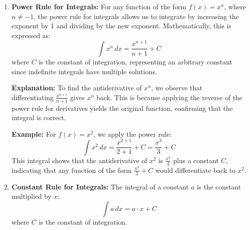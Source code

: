 \begin{enumerate}
    \item \textbf{Power Rule for Integrals:} For any function of the form \( f(x) = x^n \), where \( n \neq -1 \), the power rule for integrals allows us to integrate by increasing the exponent by 1 and dividing by the new exponent. Mathematically, this is expressed as:
    \[
    \int x^n \, dx = \frac{x^{n+1}}{n+1} + C
    \]
    where \( C \) is the constant of integration, representing an arbitrary constant since indefinite integrals have multiple solutions.

    \textbf{Explanation:} To find the antiderivative of \( x^n \), we observe that differentiating \( \frac{x^{n+1}}{n+1} \) gives \( x^n \) back. This is because applying the reverse of the power rule for derivatives yields the original function, confirming that the integral is correct.

    \textbf{Example:} For \( f(x) = x^2 \), we apply the power rule:
    \[
    \int x^2 \, dx = \frac{x^{2+1}}{2+1} + C = \frac{x^3}{3} + C
    \]
    This integral shows that the antiderivative of \( x^2 \) is \( \frac{x^3}{3} \) plus a constant \( C \), indicating that any function of the form \( \frac{x^3}{3} + C \) would differentiate back to \( x^2 \).

    \begin{center}
    \end{center}

    \item \textbf{Constant Rule for Integrals:} The integral of a constant \( a \) is the constant multiplied by \( x \):
    \[
    \int a \, dx = a \cdot x + C
    \]
    where \( C \) is the constant of integration.


\end{enumerate}

